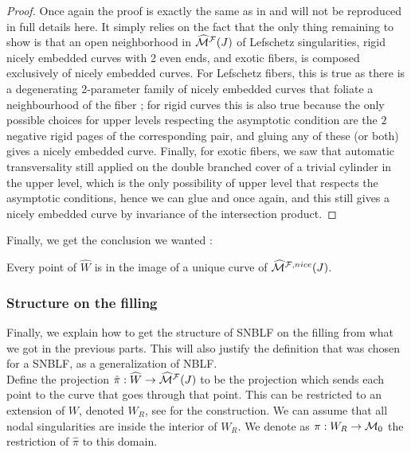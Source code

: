 \documentclass[../main.tex]{subfiles}
\begin{document}
\begin{proof}
Once again the proof is exactly the same as in \cite{SOBD2} and will not be reproduced in full details here. It simply relies on the fact that the only thing remaining to show is that an open neighborhood in $\widehat{\mathcal{M}}^{\mathcal{F}}(J)$ of Lefschetz singularities, rigid nicely embedded curves with 2 even ends, and exotic fibers, is composed exclusively of nicely embedded curves. For Lefschetz fibers, this is true as there is a degenerating 2-parameter family of nicely embedded curves that foliate a neighbourhood of the fiber ; for rigid curves this is also true because the only possible choices for upper levels respecting the asymptotic condition are the $2$ negative rigid pages of the corresponding pair, and gluing any of these (or both) gives a nicely embedded curve. Finally, for exotic fibers, we saw that automatic transversality still applied on the double branched cover of a trivial cylinder in the upper level, which is the only possibility of upper level that respects the asymptotic conditions, hence we can glue and once again, and this still gives a nicely embedded curve by invariance of the intersection product.
\end{proof}

Finally, we get the conclusion we wanted : 

\begin{lemma}
Every point of $\widehat{W}$ is in the image of a unique curve of $\widehat{\mathcal{M}}^{\mathcal{F},nice}(J)$.
\end{lemma}



\subsubsection{Structure on the filling}
Finally, we explain how to get the structure of SNBLF on the filling from what we got in the previous parts. This will also justify the definition that was chosen for a SNBLF, as a generalization of NBLF. \\

Define the projection $\hat\pi : \widehat{W}\rightarrow \widehat{\mathcal{M}}^{\mathcal{F}}(J)$ to be the projection which sends each point to the curve that goes through that point. This can be restricted to an extension of $W$, denoted $W_R$, see \cite{SOBD2} for the construction. We can assume that all nodal singularities are inside the interior of $W_R$. We denote as $\pi : W_R \rightarrow \mathcal{M}_0$ the restriction of $\hat\pi$ to this domain.  
\end{document}
